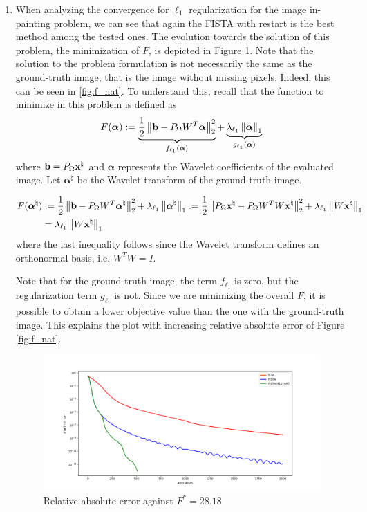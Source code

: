 \documentclass{article}
\begin{document}
\begin{enumerate}[label=2.\arabic*]
    
    \item When analyzing the convergence for $\ell_1$ regularization for the image in-painting problem, we can see that again the FISTA with restart is the best method among the tested ones. The evolution towards the solution of this problem, the minimization of $F$, is depicted in Figure \ref{fig:f_star}. Note that the solution to the problem formulation is not necessarily the same as the ground-truth image, that is the image without missing pixels. Indeed, this can be seen in \ref{fig:f_nat}. To understand this, recall that the function to minimize in this problem is defined as
    \begin{align}
        F(\boldsymbol{\alpha}) := \underbrace{\frac{1}{2}\left\lVert\mathbf{b} - P_{\Omega} W^T \boldsymbol{\alpha}\right\rVert^2_2}_{f_{\ell_1}(\boldsymbol{\alpha})} + \underbrace{\lambda_{\ell_1} \left\lVert\boldsymbol{\alpha}\right\rVert_1}_{g_{\ell_1}(\boldsymbol{\alpha})}
    \end{align}
    where $\mathbf{b} = P_{\Omega} \mathbf{x}^\natural$ and $\boldsymbol{\alpha}$ represents the Wavelet coefficients of the evaluated image. Let $\boldsymbol{\alpha}^\natural$ be the Wavelet transform of the ground-truth image.
    
    \begin{align}
        F(\boldsymbol{\alpha}^\natural) &:= \frac{1}{2}\left\lVert\mathbf{b} - P_{\Omega} W^T \boldsymbol{\alpha}^\natural\right\rVert^2_2 + \lambda_{\ell_1} \left\lVert\boldsymbol{\alpha}^\natural\right\rVert_1 := \frac{1}{2}\left\lVert P_\Omega \mathbf{x}^\natural - P_{\Omega} W^T W \mathbf{x}^\natural\right\rVert^2_2 + \lambda_{\ell_1} \left\lVert W \mathbf{x}^\natural\right\rVert_1 \\
        &= \lambda_{\ell_1} \left\lVert W \mathbf{x}^\natural\right\rVert_1 
    \end{align}
    where the last inequality follows since the Wavelet transform defines an orthonormal basis, i.e. $W^T W= I$.
    
    Note that for the ground-truth image, the term $f_{\ell_1}$ is zero, but the regularization term $g_{\ell_1}$ is not. Since we are minimizing the overall $F$, it is possible to obtain a lower objective value than the one with the ground-truth image. This explains the plot with increasing relative absolute error of Figure \ref{fig:f_nat}.
    
    \begin{figure}[H]
        \centering
        \includegraphics[width=.9\textwidth]{img/against_f_star.png}
        \caption{Relative absolute error against $F^*=28.18$}
        \label{fig:f_star}
    \end{figure}
    

\end{enumerate}
\end{document}
